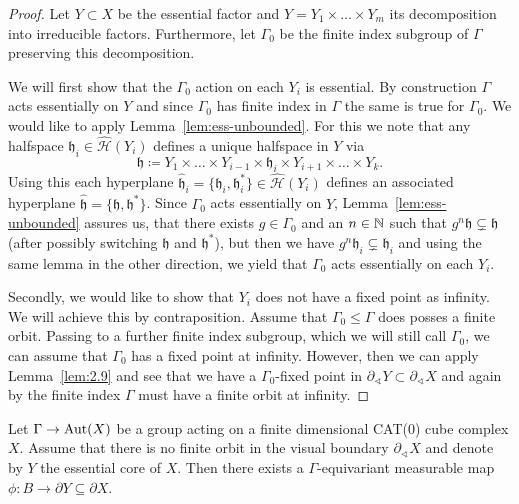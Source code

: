 \begin{proof}
  Let \(Y \subset X\) be the essential factor and \(Y = Y_1 \times \dots \times Y_m\) its decomposition into irreducible factors. Furthermore, let \(\Gamma_0\) be the finite index subgroup of \(\Gamma\) preserving this decomposition.

  We will first show that the \(\Gamma_0\) action on each \(Y_i\) is essential. By construction \(\Gamma\) acts essentially on \(Y\) and since \(\Gamma_0\) has finite index in \(\Gamma\) the same is true for \(\Gamma_0\). We would like to apply Lemma~\ref{lem:ess-unbounded}. For this we note that any halfspace \(\mathfrak{h}_i \in \mathcal{\hat H}(Y_i)\) defines a unique halfspace in \(Y\) via
  \[
    \mathfrak{h} \coloneqq Y_1 \times \dots \times Y_{i-1} \times \mathfrak{h}_i \times Y_{i+1} \times \dots \times Y_k.
  \]
  Using this each hyperplane \(\mathfrak{\hat h}_i = \{\mathfrak{h}_i , \mathfrak{h}_i^\ast\} \in \mathcal{\hat H}(Y_i)\) defines an associated hyperplane \(\mathfrak{\hat h} = \{\mathfrak{h}, \mathfrak{h}^\ast\}\). Since \(\Gamma_0\) acts essentially on \(Y\), Lemma~\ref{lem:ess-unbounded} assures us, that there exists \(g \in \Gamma_0\) and an \(n \in \mathbb{N}\) such that \(g^n \mathfrak{h} \subsetneq \mathfrak{h}\) (after possibly switching \(\mathfrak{h}\) and \(\mathfrak{h}^\ast\)), but then we have \(g^n \mathfrak{h}_i \subsetneq \mathfrak{h}_i\) and using the same lemma in the other direction, we yield that \(\Gamma_0\) acts essentially on each \(Y_i\).

  Secondly, we would like to show that \(Y_i\) does not have a fixed point as infinity. We will achieve this by contraposition. Assume that \(\Gamma_0 \leq \Gamma\) does posses a finite orbit. Passing to a further finite index subgroup, which we will still call \(\Gamma_0\), we can assume that \(\Gamma_0\) has a fixed point at infinity. However, then we can apply Lemma~\ref{lem:2.9} and see that we have a \(\Gamma_0\)-fixed point in \(\partial_\sphericalangle Y \subset \partial_\sphericalangle X\) and again by the finite index \(\Gamma\) must have a finite orbit at infinity.
\end{proof}

\begin{cor}[\cite{MR3509968}]
  Let \(\Gamma \to \operatorname{Aut}(X)\) be a group acting on a finite dimensional CAT(0) cube complex \(X\). Assume that there is no finite orbit in the visual boundary \(\partial_\sphericalangle X\) and denote by \(Y\) the essential core of \(X\). Then there exists a \(\Gamma\)-equivariant measurable map \(\phi \colon B \to \partial Y \subseteq \partial X\).
\end{cor}

